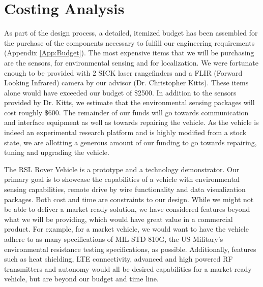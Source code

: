 \chapter{Costing Analysis}

As part of the design process, a detailed, itemized budget has been assembled for the purchase of the components necessary to fulfill our engineering requirements (Appendix \ref{App:Budget}). The most expensive items that we will be purchasing are the sensors, for environmental sensing and for localization. We were fortunate enough to be provided with 2 SICK laser rangefinders and a FLIR (Forward Looking Infrared) camera by our advisor (Dr. Christopher Kitts). These items alone would have exceeded our budget of \$2500. In addition to the sensors provided by Dr. Kitts, we estimate that the environmental sensing packages will cost roughly \$600. The remainder of our funds will go towards communication and interface equipment as well as towards repairing the vehicle. As the vehicle is indeed an experimental research platform and is highly modified from a stock state, we are allotting a generous amount of our funding to go towards repairing, tuning and upgrading the vehicle.

The RSL Rover Vehicle is a prototype and a technology demonstrator. Our primary goal is to showcase the capabilities of a vehicle with environmental sensing capabilities, remote drive by wire functionality and data visualization packages. Both cost and time are constraints to our design. While we might not be able to deliver a market ready solution, we have considered features beyond what we will be providing, which would have great value in a commercial product. For example, for a market vehicle, we would want to have the vehicle adhere to as many specifications of MIL-STD-810G, the US Military's environmental resistance testing specifications, as possible. Additionally, features such as heat shielding, LTE connectivity, advanced and high powered RF transmitters and autonomy would all be desired capabilities  for a market-ready vehicle, but are beyond our budget and time line.